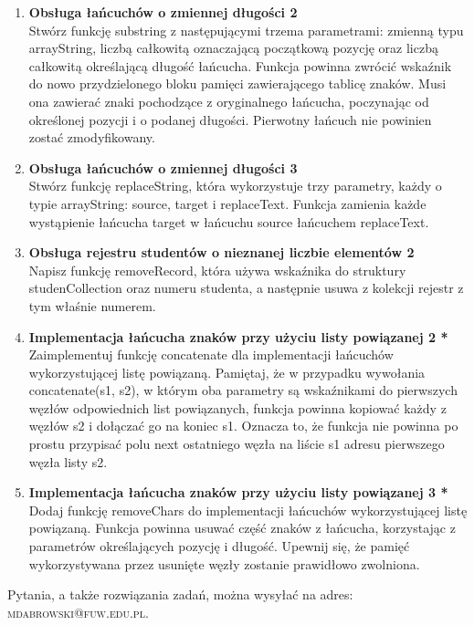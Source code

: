 \documentclass[12pt]{article}
\begin{document}
\begin{enumerate}
\newpage
{}

\item \textbf{Obsługa łańcuchów o zmiennej długości 2}\\
Stwórz funkcję \textsf{substring} z następującymi trzema parametrami: zmienną typu \textsf{arrayString}, liczbą całkowitą oznaczającą początkową pozycję oraz liczbą całkowitą określającą długość łańcucha. Funkcja powinna zwrócić wskaźnik do nowo przydzielonego bloku pamięci zawierającego tablicę znaków. Musi ona zawierać znaki pochodzące z oryginalnego łańcucha, poczynając od określonej pozycji i o podanej długości. Pierwotny łańcuch nie powinien zostać zmodyfikowany.

\item \textbf{Obsługa łańcuchów o zmiennej długości 3}\\
Stwórz funkcję \textsf{replaceString}, która wykorzystuje trzy parametry, każdy o typie \textsf{arrayString}: \textsf{source}, \textsf{target} i \textsf{replaceText}. Funkcja zamienia każde wystąpienie łańcucha \textsf{target} w łańcuchu \textsf{source} łańcuchem \textsf{replaceText}.

\item \textbf{Obsługa rejestru studentów o nieznanej liczbie elementów 2}\\
Napisz funkcję \textsf{removeRecord}, która używa wskaźnika do struktury \textsf{studenCollection} oraz numeru studenta, a następnie usuwa z kolekcji rejestr z tym właśnie numerem.

\item \textbf{Implementacja łańcucha znaków przy użyciu listy powiązanej 2 *}\\
Zaimplementuj funkcję \textsf{concatenate} dla implementacji łańcuchów wykorzystującej listę powiązaną. Pamiętaj, że w przypadku wywołania \textsf{concatenate(s1, s2)}, w którym oba parametry są wskaźnikami do pierwszych węzłów odpowiednich list powiązanych, funkcja powinna kopiować każdy z węzłów \textsf{s2} i dołączać go na koniec \textsf{s1}. Oznacza to, że funkcja nie powinna po prostu przypisać polu next ostatniego węzła na liście \textsf{s1} adresu pierwszego węzła listy \textsf{s2}.

\item \textbf{Implementacja łańcucha znaków przy użyciu listy powiązanej 3 *}\\
Dodaj funkcję \textsf{removeChars} do implementacji łańcuchów wykorzystującej listę powiązaną. Funkcja powinna usuwać część znaków z łańcucha, korzystając z parametrów określających pozycję i długość. Upewnij się, że pamięć wykorzystywana przez usunięte węzły zostanie prawidłowo zwolniona.



\end{enumerate}
\vspace{1cm}
\small Pytania, a także rozwiązania zadań, można wysyłać na adres: \textsc{mdabrowski@fuw.edu.pl}.
\end{document}
